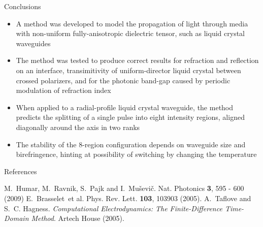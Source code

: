 \documentclass[8pt]{beamer}
\newlength{\wideitemsep}
\let\olditem\item
\renewcommand{\item}{\setlength{\itemsep}{\wideitemsep}\olditem}
\newcommand{\blockpadding}{
  \rule[-0.6ex]{0pt}{2.5ex}
}
\begin{document}
\begin{columns}[t]
\begin{column}{0.596\textwidth}
\begin{block}{\blockpadding Conclusions}
 \begin{itemize}
  \item A method was developed to model the propagation of light through media with non-uniform fully-anisotropic dielectric tensor, such as liquid crystal waveguides
  \item The method was tested to produce correct results for refraction and reflection on an interface, transimitivity of uniform-director liquid crystal between crossed polarizers, and for the photonic band-gap caused by periodic modulation of refraction index
  \item When applied to a radial-profile liquid crystal waveguide, the method predicts the splitting of a single pulse into eight intensity regions, aligned diagonally around the axis in two ranks
  \item The stability of the 8-region configuration depends on waveguide size and birefringence, hinting at possibility of switching by changing the temperature
 \end{itemize}

\end{block}


 \begin{block}{\blockpadding References}
  \begin{thebibliography}{6}
M.~Humar, M.~Ravnik, S.~Pajk and I.~Mu\v sevi\v c. Nat. Photonics {\bf 3}, 595 - 600 (2009) 
E.~Brasselet~et al. Phys. Rev. Lett. {\bf 103}, 103903 (2005).
A.~Taflove and S.~C. Hagness. {\em Computational Electrodynamics: The Finite-Difference Time-Domain Method}. Artech House (2005).
\end{thebibliography}

 \end{block}

 \end{column}

\end{columns}
\end{document}
